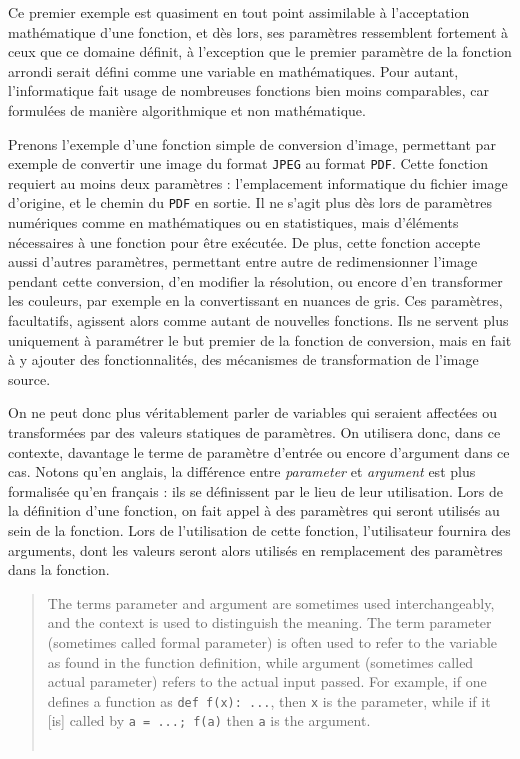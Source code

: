 Ce premier exemple est quasiment en tout point assimilable à l'acceptation mathématique d'une fonction, et dès lors, ses paramètres ressemblent fortement à ceux que ce domaine définit, à l'exception que le premier paramètre de la fonction arrondi serait défini comme une variable en mathématiques.
Pour autant, l'informatique fait usage de nombreuses fonctions bien moins comparables, car formulées de manière algorithmique et non mathématique.

Prenons l'exemple d'une fonction simple de conversion d'image, permettant par exemple de convertir une image du format \texttt{JPEG} au format \texttt{PDF}.
Cette fonction requiert au moins deux \og paramètres\fg{} :
	l'emplacement informatique du fichier image d'origine, et le chemin du \texttt{PDF} en sortie.
Il ne s'agit plus dès lors de paramètres numériques comme en mathématiques ou en statistiques, mais d'éléments nécessaires à une fonction pour être exécutée.
De plus, cette fonction accepte aussi d'autres \og paramètres\fg{}, permettant entre autre de redimensionner l'image pendant cette conversion, d'en modifier la résolution, ou encore d'en transformer les couleurs, par exemple en la convertissant en nuances de gris.
Ces paramètres, facultatifs, agissent alors comme autant de nouvelles fonctions.
Ils ne servent plus uniquement à \og paramétrer\fg{} le but premier de la fonction de conversion, mais en fait à y ajouter des fonctionnalités, des mécanismes de transformation de l'image source.

On ne peut donc plus véritablement parler de variables qui seraient affectées ou transformées par des valeurs statiques de paramètres.
On utilisera donc, dans ce contexte, davantage le terme de paramètre d'entrée ou encore d'argument dans ce cas.
Notons qu'en anglais, la différence entre \textit{parameter} et \textit{argument} est plus formalisée qu'en français : ils se définissent par le lieu de leur utilisation.
Lors de la définition d'une fonction, on fait appel à des paramètres qui seront utilisés au sein de la fonction.
Lors de l'utilisation de cette fonction, l'utilisateur fournira des arguments, dont les valeurs seront alors utilisés en remplacement des paramètres dans la fonction.

\begin{quotation}
	\noindent \og The terms parameter and argument are sometimes used interchangeably, and the context is used to distinguish the meaning. The term parameter (sometimes called formal parameter) is often used to refer to the variable as found in the function definition, while argument (sometimes called actual parameter) refers to the actual input passed. For example, if one defines a function as \texttt{def f(x): ...}, then \texttt{x} is the parameter, while if it [is] called by \texttt{a = ...; f(a)} then \texttt{a} is the argument.\fg{}\\
	\mbox{}~ \hfill \autocite{wiki_parameter2017} 
\end{quotation}


